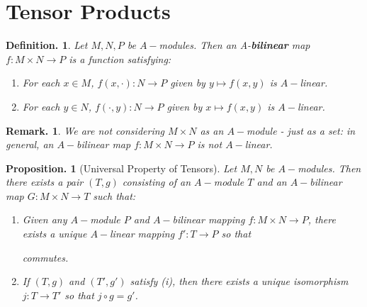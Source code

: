 \documentclass[11pt, a4paper]{memoir}
\theoremstyle{change}
\newtheorem{proposition}[theorem]{Proposition.}
\theoremstyle{plain}
\theoremstyle{nonumberplain}
\newtheorem{definition}{Definition.}
\newtheorem{remark}{Remark.}
\numberwithin{equation}{section}
\begin{document}
\section{Tensor Products}
\begin{definition}
    Let $M,N,P$ be $A-$modules.
    Then an A-\textbf{bilinear} map $f:M\times N\to P$ is a function satisfying:
    \begin{enumerate}[nolistsep]
        \item For each $x\in M$, $f(x,\cdot):N\to P$ given by $y\mapsto f(x,y)$ is $A-$linear.
        \item For each $y\in N$, $f(\cdot,y):N\to P$ given by $x\mapsto f(x,y)$ is $A-$linear.
    \end{enumerate}
\end{definition}
\begin{remark}
    We are not considering $M\times N$ as an $A-$module - just as a set: in general, an $A-$bilinear map $f:M\times N\to P$ is not $A-$linear.
\end{remark}
\begin{proposition}[Universal Property of Tensors]
    Let $M,N$ be $A-$modules.
    Then there exists a pair $(T,g)$ consisting of an $A-$module $T$ and an $A-$bilinear map $G:M\times N\to T$ such that:
    \begin{enumerate}[nolistsep,label=(\roman*)]
        \item Given any $A-$module $P$ and $A-$bilinear mapping $f:M\times N\to P$, there exists a unique $A-$linear mapping $f':T\to P$ so that
            \begin{center}
            \end{center}
            commutes.
        \item If $(T,g)$ and $(T',g')$ satisfy (i), then there exists a unique isomorphism $j:T\to T'$ so that $j\circ g=g'$.
    \end{enumerate}
\end{proposition}
\end{document}
